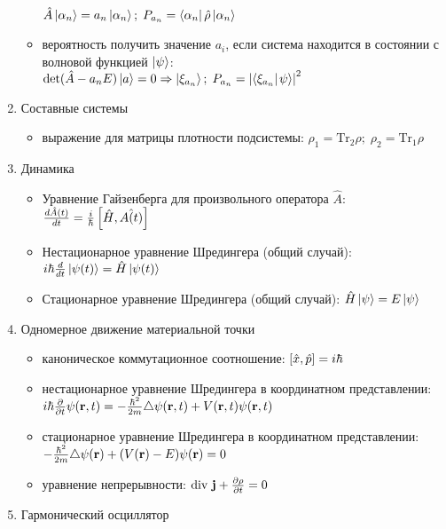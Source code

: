 \begin{enumerate}[label=\textbf{\underline{\arabic*.}}]
\begin{itemize}
            $ \hat{A}\ket{\alpha_n}=a_n\ket{\alpha_n};\; P_{a_n} = \matrixel{\alpha_n}{\hat{\rho}}{\alpha_n} $
            \item вероятность получить значение $a_i$, если система находится в состоянии с волновой функцией $\left| \psi \right>$: \\
            $ \text{det}(\hat{A}-a_n E)\ket{a} = 0 \Rightarrow \ket{\xi_{a_n}};\; P_{a_n} = \abs{\braket{\xi_{a_n}}{\psi}}^2 $
        \end{itemize}
\item Составные системы  \begin{itemize}
            \item выражение для матрицы плотности подсистемы:
            $ \rho_1 = \text{Tr}_2 \rho;\; \rho_2 = \text{Tr}_1 \rho $
        \end{itemize}
\item Динамика  \begin{itemize}
            \item Уравнение Гайзенберга для произвольного оператора $\hat{A}$:
            $ \frac{d \hat{A}(t)}{d t}=\frac{i}{\hbar}\left[ \hat{H}, \hat{A(t)} \right] $
            \item Нестационарное уравнение Шредингера (общий случай):
            $ i\hbar \frac{d }{d t}\left| \psi(t) \right> = \hat{H}\left| \psi(t) \right> $
            \item Стационарное уравнение Шредингера (общий случай):
            $ \hat{H}\left| \psi \right> = E\left| \psi \right> $
        \end{itemize}
\item Одномерное движение материальной точки  \begin{itemize}
            \item каноническое коммутационное соотношение:
            $ \left[ \hat{x}, \hat{p} \right] = i\hbar $
            \item нестационарное уравнение Шредингера в координатном представлении: \\
            $ i\hbar \frac{\partial }{\partial t}\psi(\mathbf{r},t) = -\frac{\hbar^2}{2m}\triangle\psi(\mathbf{r},t)+V(\mathbf{r},t)\psi(\mathbf{r},t) $
            \item стационарное уравнение Шредингера в координатном представлении: \\
            $ -\frac{\hbar^2}{2m}\triangle\psi(\mathbf{r}) + (V(\mathbf{r})-E)\psi(\mathbf{r}) = 0 $
            \item уравнение непрерывности:
            $ \text{div}\ \v{j} + \pd{\rho}{t} = 0 $
        \end{itemize}
\item Гармонический осциллятор  \begin{itemize}

\end{itemize}
\end{enumerate}
